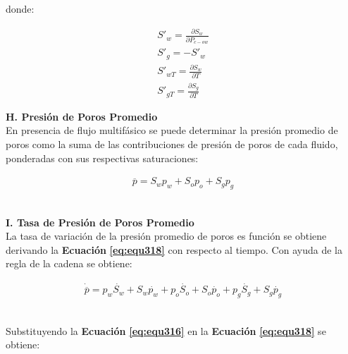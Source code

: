 donde:

\begin{ceqn} 
\begin{subequations} \label{eq:equ317} 
\begin{gather}
S'_w = \frac{\partial S_w}{\partial P_{c-ow}}
\label{eq:equ317a} \\[3pt]
S'_g = -S'_w
\label{eq:equ317b} \\[3pt]
S'_{wT} = \frac{\partial S_w}{\partial T}
\label{eq:equ317c} \\[3pt]
S'_{gT} = \frac{\partial S_g}{\partial T}
\label{eq:equ317d}
\end{gather}  
\end{subequations} 
\end{ceqn}


\textbf{H. Presión de Poros Promedio}
\\
En presencia de flujo multifásico se puede determinar la presión promedio de poros como la suma de las contribuciones de presión de poros de cada fluido, ponderadas con sus respectivas saturaciones:

\begin{ceqn} 
\begin{gather} \label{eq:equ318} 
\overline{p} = S_w p_w + S_o p_o + S_g p_g
\end{gather}  
\end{ceqn}
\\
\textbf{I. Tasa de Presión de Poros Promedio}
\\
La tasa de variación de la presión promedio de poros es función se obtiene derivando la \textbf{Ecuación} \textbf{\ref{eq:equ318}} con respecto al tiempo. Con ayuda de la regla de la cadena se obtiene:\bigskip

\begin{ceqn} 
\begin{gather} \label{eq:equ319}
\dot{\overline{p}} = p_w\dot{S_w} + S_w\dot{p_w} + p_o\dot{S_o} + S_o\dot{p_o} + p_g\dot{S_g} + S_g\dot{p_g}
\end{gather}  
\end{ceqn}
\\
Substituyendo la \textbf{Ecuación} \textbf{\ref{eq:equ316}} en la \textbf{Ecuación} \textbf{\ref{eq:equ318}} se obtiene:


